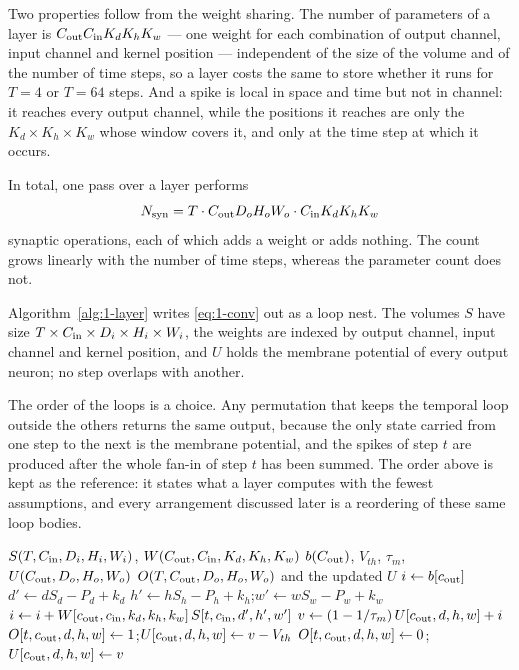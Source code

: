 Two properties follow from the weight sharing. The number of parameters of a
layer is $C_{\mathrm{out}} C_{\mathrm{in}} K_d K_h K_w$ --- one weight for each combination of output
channel, input channel and kernel position --- independent of the size of the
volume and of the number of time steps, so a layer costs the same to store
whether it runs for $T=4$ or $T=64$ steps. And a spike is local in space and
time but not in channel: it reaches every output channel, while the positions
it reaches are only the $K_d \times K_h \times K_w$ whose window covers it, and
only at the time step at which it occurs.

In total, one pass over a layer performs
\begin{equation}
N_{\mathrm{syn}} = T \cdot C_{\mathrm{out}} D_o H_o W_o \cdot C_{\mathrm{in}} K_d K_h K_w
\label{eq:1-count}
\end{equation}
synaptic operations, each of which adds a weight or adds nothing. The count
grows linearly with the number of time steps, whereas the parameter count does
not.

Algorithm~\ref{alg:1-layer} writes \eqref{eq:1-conv} out as a loop nest. The
volumes $S$ have size $T\times C_{\mathrm{in}}\times D_i\times H_i\times W_i$, the weights
are indexed by output channel, input channel and kernel position, and $U$ holds
the membrane potential of every output neuron; no step overlaps with another.

The order of the loops is a choice. Any permutation that keeps the temporal loop
outside the others returns the same output, because the only state carried from
one step to the next is the membrane potential, and the spikes of step $t$ are
produced after the whole fan-in of step $t$ has been summed. The order above is
kept as the reference: it states what a layer computes with the fewest
assumptions, and every arrangement discussed later is a reordering of these same
loop bodies.

\begin{algorithm}[!htb]
\caption{One SCNN layer, evaluated sequentially.}
\label{alg:1-layer}
\scriptsize
\algrenewcommand\algorithmicindent{1.1em}
\begin{algorithmic}[1]
\Require $S(T,C_{\mathrm{in}},D_i,H_i,W_i)$, $W(C_{\mathrm{out}},C_{\mathrm{in}},K_d,K_h,K_w)$
\Statex \hspace{2.4em}$b(C_{\mathrm{out}})$, $V_{th}$, $\tau_m$, $U(C_{\mathrm{out}},D_o,H_o,W_o)$
\Ensure $O(T,C_{\mathrm{out}},D_o,H_o,W_o)$ and the updated $U$
    \State $i \gets b[c_{\mathrm{out}}]$
        \State $d' \gets dS_d-P_d+k_d$
        \State $h' \gets hS_h-P_h+k_h$;\quad $w' \gets wS_w-P_w+k_w$
          \State $i \gets i + W[c_{\mathrm{out}},c_{\mathrm{in}},k_d,k_h,k_w]\,S[t,c_{\mathrm{in}},d',h',w']$
        \EndIf
      \EndFor
    \EndFor
    \State $v \gets (1-1/\tau_m)\,U[c_{\mathrm{out}},d,h,w] + i$
      \State $O[t,c_{\mathrm{out}},d,h,w] \gets 1$;\quad $U[c_{\mathrm{out}},d,h,w] \gets v-V_{th}$
    \Else
      \State $O[t,c_{\mathrm{out}},d,h,w] \gets 0$;\quad $U[c_{\mathrm{out}},d,h,w] \gets v$
    \EndIf
  \EndFor
\EndFor
\end{algorithmic}
\end{algorithm}

